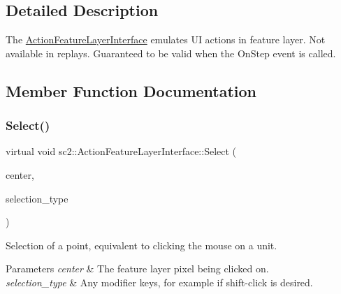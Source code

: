 \subsection{Detailed Description}
The \hyperlink{classsc2_1_1_action_feature_layer_interface}{Action\+Feature\+Layer\+Interface} emulates UI actions in feature layer. Not available in replays. Guaranteed to be valid when the On\+Step event is called. 

\subsection{Member Function Documentation}
\mbox{\label{classsc2_1_1_action_feature_layer_interface_ae61f19efc78b6114d91ca64f1fb72108}} 
\subsubsection{\texorpdfstring{Select()}{Select()}\hspace{0.1cm}{\footnotesize\ttfamily [1/2]}}
{\footnotesize\ttfamily virtual void sc2\+::\+Action\+Feature\+Layer\+Interface\+::\+Select (\begin{DoxyParamCaption}\item[{const \hyperlink{structsc2_1_1_point2_d_i}{Point2\+DI} \&}]{center,  }\item[{Point\+Selection\+Type}]{selection\+\_\+type }\end{DoxyParamCaption})\hspace{0.3cm}{\ttfamily [pure virtual]}}

Selection of a point, equivalent to clicking the mouse on a unit. 
\begin{DoxyParams}{Parameters}
{\em center} & The feature layer \textquotesingle{}pixel\textquotesingle{} being clicked on. \\
\hline
{\em selection\+\_\+type} & Any modifier keys, for example if \textquotesingle{}shift-\/click\textquotesingle{} is desired. \\
\hline
\end{DoxyParams}
\mbox{\label{classsc2_1_1_action_feature_layer_interface_a084b4cd006586c0a9637b1067a437a42}} 
